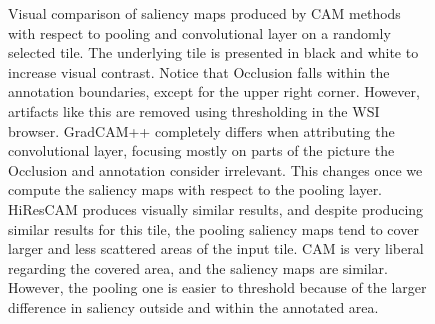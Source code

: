 \begin{figure}
\begin{center}
    \caption{Visual comparison of saliency maps produced by CAM methods with respect to pooling and convolutional layer on a randomly selected tile. The underlying tile is presented in black and white to increase visual contrast. Notice that Occlusion falls within the annotation boundaries, except for the upper right corner. However, artifacts like this are removed using thresholding in the WSI browser. GradCAM++ completely differs when attributing the convolutional layer, focusing mostly on parts of the picture the Occlusion and annotation consider irrelevant. This changes once we compute the saliency maps with respect to the pooling layer. HiResCAM produces visually similar results, and despite producing similar results for this tile, the pooling saliency maps tend to cover larger and less scattered areas of the input tile. CAM is very liberal regarding the covered area, and the saliency maps are similar. However, the pooling one is easier to threshold because of the larger difference in saliency outside and within the annotated area.}
    \label{fig:conv-vs-pool}
    \end{center}
\end{figure}

